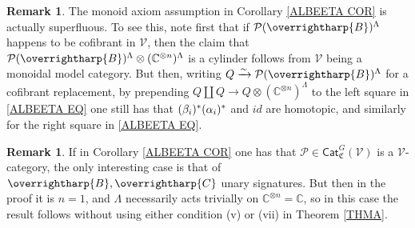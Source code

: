 \documentclass[a4paper,10pt
,draft
]{article}%
\numberwithin{equation}{section}
\numberwithin{figure}{section}
\theoremstyle{definition} %
\newtheorem{remark}[equation]{Remark}%
\newcommand{\vect}[1]{\text{\overrightharp{\ensuremath{#1}}}}
\newcommand{\V}{\ensuremath{\mathcal V}}
\renewcommand{\P}{\ensuremath{\mathcal P}}
\newcommand{\1}{\ensuremath{\mathbbm 1}}%
\begin{document}
\begin{remark}\label{MONAXSUP REM}
	The monoid axiom assumption in Corollary \ref{ALBEETA COR} 
	is actually superfluous.
	To see this, note first that if
	$\mathcal{P}(\vect{B})^{\Lambda}$ happens to be cofibrant in $\V$,
	then the claim that
	$\mathcal{P}(\vect{B})^{\Lambda} \otimes (\mathbb{C}^{\otimes n})^{\Lambda}$
	is a cylinder follows from $\V$ being a monoidal model category.
	But then, writing $Q \xrightarrow{\sim} \mathcal{P}(\vect{B})^{\Lambda}$
	for a cofibrant replacement,
	by prepending 
	$Q \amalg Q \to Q \otimes (\mathbb{C}^{\otimes n})^{\Lambda}$
	to the left square in \eqref{ALBEETA EQ}
	one still has that 
	$(\beta_i)^{\**}(\alpha_i)^{\**}$
	and
	$id$
	are homotopic, and similarly for the right square in \eqref{ALBEETA EQ}.
\end{remark}



\begin{remark}\label{ALBEETA_REM}
If in Corollary \ref{ALBEETA COR}
one has that $\P \in \mathsf{Cat}^G_{\mathfrak{C}}(\V)$
is a $\V$-category,
the only interesting case is that of
$\vect{B},\vect{C}$ unary signatures.
But then in the proof it is $n=1$,
and $\Lambda$ necessarily acts trivially on
$\mathbb{C}^{\otimes n} = \mathbb{C}$,
so in this case the result follows without using either condition (v) or (vii) in Theorem \ref{THMA}.
\end{remark}
\end{document}
